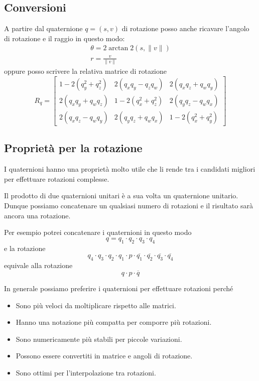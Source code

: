 \subsection{Conversioni}
A partire dal quaternione $q = (s, v)$ di rotazione posso anche ricavare l'angolo di rotazione e il raggio in questo modo:
\begin{gather*}
	\theta = 2 \arctan 2 (s, \| v \|) \\
	r = \frac{v}{\| v \|}
\end{gather*}
oppure posso scrivere la relativa matrice di rotazione
\[
	R_q = \begin{bmatrix}
		1 - 2 (q_y^2 + q_z^2) & 2 (q_x q_y - q_z q_w) & 2 (q_x q_z + q_w q_y) \\
		2 (q_x q_y + q_w q_z) & 1 - 2 (q_x^2 + q_z^2) & 2 (q_y q_z - q_w q_x) \\
		2 (q_x q_z - q_w q_y) & 2 (q_y q_z + q_w q_x) & 1 - 2 (q_x^2 + q_y^2)
	\end{bmatrix}
\]

\subsection{Propriet\`a per la rotazione}
I quaternioni hanno una propriet\`a molto utile che li rende tra i candidati migliori per effettuare rotazioni complesse.

Il prodotto di due quaternioni unitari \`e a sua volta un quaternione unitario. Dunque possiamo
concatenare un qualsiasi numero di rotazioni e il risultato sar\`a ancora una rotazione.

Per esempio potrei concatenare i quaternioni in questo modo
\[ q = q_1 \cdot q_2 \cdot q_3 \cdot q_4 \]
e la rotazione
\[
	q_4 \cdot q_3 \cdot q_2 \cdot q_1 \cdot p \cdot
	\overline{q_1} \cdot \overline{q_2} \cdot \overline{q_3} \cdot \overline{q_4}
\]
equivale alla rotazione
\[ q \cdot p \cdot \overline{q} \]

In generale possiamo preferire i quaternioni per effettuare rotazioni perch\'e
\begin{itemize}
	\item Sono pi\`u veloci da moltiplicare rispetto alle matrici.
	\item Hanno una notazione pi\`u compatta per comporre pi\`u rotazioni.
	\item Sono numericamente pi\`u stabili per piccole variazioni.
	\item Possono essere convertiti in matrice e angoli di rotazione.
	\item Sono ottimi per l'interpolazione tra rotazioni.
\end{itemize}